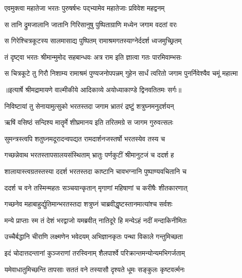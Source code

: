\twolineshloka
{एवमुक्त्वा महातेजा भरतः पुरुषर्षभः}
{पद्भ्यामेव महातेजाः प्रविवेश महद्वनम्} %

\twolineshloka
{स तानि द्रुमजालानि जातानि गिरिसानुषु}
{पुष्पिताग्राणि मध्येन जगाम वदतां वरः} %

\twolineshloka
{स गिरेश्चित्रकूटस्य सालमासाद्य पुष्पितम्}
{रामाश्रमगतस्याग्नेर्ददर्श ध्वजमुच्छ्रितम्} %

\twolineshloka
{तं दृष्ट्वा भरतः श्रीमान्मुमोद सहबान्धवः}
{अत्र राम इति ज्ञात्वा गतः पारमिवाम्भसः} %

\fourlineindentedshloka
{स चित्रकूटे तु गिरौ निशाम्य}
{रामाश्रमं पुण्यजनोपपन्नम्}
{गुहेन सार्धं त्वरितो जगाम}
{पुनर्निवेश्यैव चमूं महात्मा} %


{॥इत्यार्षे श्रीमद्रामायणे वाल्मीकीये आदिकाव्ये अयोध्याकाण्डे द्विनवतितमः सर्गः॥}


\twolineshloka
{निविष्टायां तु सेनायामुत्सुको भरतस्तदा}
{जगाम भ्रातरं द्रष्टुं शत्रुघ्नमनुदर्शयन्} %

\twolineshloka
{ऋषिं वसिष्ठं सन्दिश्य मातॄर्मे शीघ्रमानय}
{इति तरितमग्रे स जागम गुरुवत्सलः} %

\twolineshloka
{सुमन्त्रस्त्वपि शतुघ्नमदूरादन्वपद्यत}
{रामदार्शनजस्तर्षो भरतस्येव तस्य च} %

\twolineshloka
{गच्छन्नेवाथ भरतस्तापसालयसंस्थिताम्}
{भ्रातुः पर्णकुटीं श्रीमानुटजं च ददर्श ह} %

\twolineshloka
{शालायास्त्वग्रतस्तस्या ददर्श भरतस्तदा}
{काष्टानि चावभग्नानि पुष्पाण्यवचितानि च} %

\twolineshloka
{ददर्श च वने तस्मिन्महतः सञ्चयान्कृतान्}
{मृगाणां महिषाणां च करीषैः शीतकारणात्} %

\twolineshloka
{गच्छनेव महाबाहुर्द्युतिमान्भरतस्तदा}
{शत्रुघ्नं चाब्रवीद्धृष्टस्तानमात्यांश्च सर्वशः} %

\twolineshloka
{मन्ये प्राप्ताः स्म तं देशं भरद्वाजो यमब्रवीत्}
{नातिदूरे हि मन्येऽहं नदीं मन्दाकिनीमितः} %

\twolineshloka
{उच्चैर्बद्धानि चीराणि लक्ष्मणेन भवेदयम्}
{अभिज्ञानकृतः पन्था विकाले गन्तुमिच्छता} %

\twolineshloka
{इदं चोदात्तदन्तानां कुञ्जराणां तरस्विनाम्}
{शैलपार्श्वे परिक्रान्तमन्योन्यमभिगर्जताम्} %

\twolineshloka
{यमेवाधातुमिच्छन्ति तापसाः सततं वने}
{तस्यासौ दृश्यते धूमः सङ्कुलः कृष्टवर्त्मनः} %

